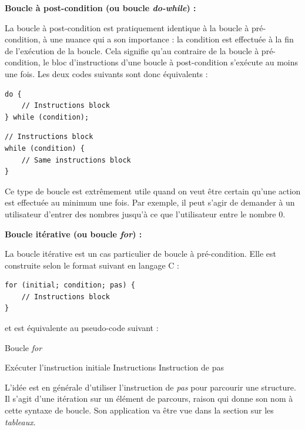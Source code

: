 \documentclass[../../../main.tex]{subfiles}
\begin{document}
\textbf{Boucle à post-condition (ou boucle \textit{do-while}) :}
 
La boucle à post-condition est pratiquement identique à la boucle à pré-condition, à une nuance qui a son importance : la condition est effectuée à la fin de l'exécution de la boucle. Cela signifie qu'au contraire de la boucle à pré-condition, le bloc d'instructions d'une boucle à post-condition s'exécute au moins une fois. Les deux codes suivants sont donc équivalents :
 
\begin{minipage}{0.5\textwidth}
\begin{verbatim}
do {
	// Instructions block
} while (condition);

\end{verbatim}
\end{minipage}
\begin{minipage}{0.5\textwidth}
\begin{verbatim}
// Instructions block
while (condition) {
	// Same instructions block
}
\end{verbatim}
\end{minipage}
 
Ce type de boucle est extrêmement utile quand on veut être certain qu'une action est effectuée au minimum une fois. Par exemple, il peut s'agir de demander à un utilisateur d'entrer des nombres jusqu'à ce que l'utilisateur entre le nombre $0$.
 
\textbf{Boucle itérative (ou boucle \textit{for}) :}
 
La boucle itérative est un cas particulier de boucle à pré-condition. Elle est construite selon le format suivant en langage C :
\begin{verbatim}
for (initial; condition; pas) {
	// Instructions block
}
\end{verbatim}
et est équivalente au pseudo-code suivant :
\begin{algorithm}
\caption{Boucle \textit{for}}
Exécuter l'instruction initiale\;
 {
	Instructions 
	Instruction de pas 
}
\end{algorithm} \newline
L'idée est en générale d'utiliser l'instruction de \textit{pas} pour parcourir une structure. Il s'agit d'une itération sur un élément de parcours, raison qui donne son nom à cette syntaxe de boucle. Son application va être vue dans la section sur les \textit{tableaux}.
 
\end{document}
